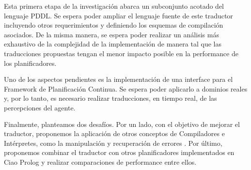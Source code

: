 Esta primera etapa de la investigaci\'on abarca un subconjunto
acotado del lenguaje PDDL. Se espera poder ampliar el lenguaje fuente
de este traductor incluyendo otros requerimientos y definiendo los 
esquemas de compilaci\'on asociados. De la misma manera, se espera poder
realizar un an\'alisis m\'as exhaustivo de la complejidad de la
implementaci\'on de manera tal que las traducciones propuestas tengan
el menor impacto posible en la performance de los planificadores.

Uno de los aspectos pendientes es la implementaci\'on de una
interface para el Framework de Planificaci\'on
Continua. Se espera poder aplicarlo a dominios reales y, por lo 
tanto, es necesario realizar traducciones, en tiempo
real, de las percepciones del agente.

Finalmente, planteamos dos desaf\'ios. Por un lado, con el objetivo de 
mejorar el traductor, proponemos la aplicaci\'on de otros conceptos 
de Compiladores e Int\'erpretes, como la manipulaci\'on y
recuperaci\'on de errores \cite{gbraun:Aho:2007}. Por \'ultimo,
proponemos combinar el traductor con otros planificadores implementados
en Ciao Prolog y realizar comparaciones de performance entre ellos.


